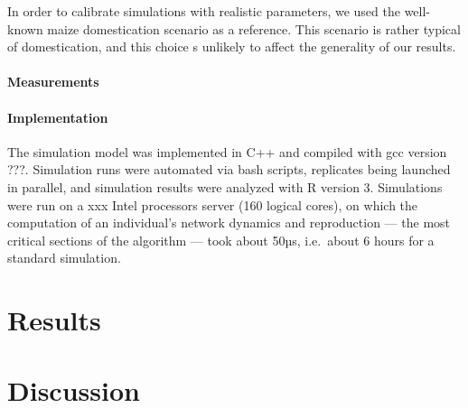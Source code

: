 \documentclass[12pt]{article}
\begin{document}
In order to calibrate simulations with realistic parameters, we used the well-known maize domestication scenario as a reference. This scenario is rather typical of domestication, and this choice s unlikely to affect the generality of our results. 

\paragraph{Measurements} 

\paragraph{Implementation} The simulation model was implemented in C++ and compiled with gcc version ???. Simulation runs were automated via bash scripts, replicates being launched in parallel, and simulation results were analyzed with R version 3.  Simulations were run on a xxx Intel processors server (160 logical cores), on which the computation of an individual's network dynamics and reproduction --- the most critical sections of the algorithm --- took about 50µs, i.e.\ about 6 hours for a standard simulation. 

\section{Results}

\section{Discussion}

\printbibliography
\end{document}
